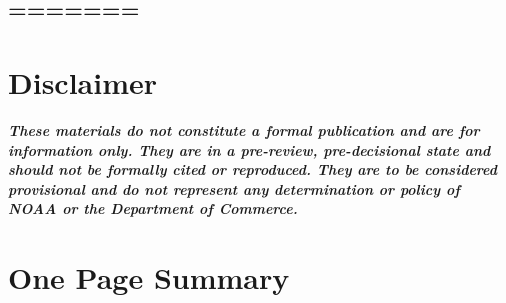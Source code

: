 \documentclass[11pt,
  english,
  letterpaper,
]{article}
\begin{document}
\newpage
\thispagestyle{empty} %

\pagestyle{plain}  %
\renewcommand*{\thefootnote}{\arabic{footnote}}  %
\setcounter{footnote}{0}  %
\renewcommand{\headrulewidth}{0.5pt}
\renewcommand{\footrulewidth}{0.5pt}

\newcommand{\lt}{\ensuremath <}
\newcommand{\gt}{\ensuremath >}

\hypertarget{section}{%
\subsection{=======}\label{section}}

\vspace{500cm}

\hypertarget{disclaimer}{%
\section*{Disclaimer}\label{disclaimer}}

\emph{\textbf{These materials do not constitute a formal publication and are for information only. They are in a pre-review, pre-decisional state and should not be formally cited or reproduced. They are to be considered provisional and do not represent any determination or policy of NOAA or the Department of Commerce.}}

\pagebreak
{}
\setcounter{page}{1}

\renewcommand{\thetable}{\roman{table}}
\renewcommand{\thefigure}{\roman{figure}}

\setlength\parskip{0.5em plus 0.1em minus 0.2em}

\hypertarget{one-page-summary}{%
\section*{One Page Summary}\label{one-page-summary}}
\end{document}
